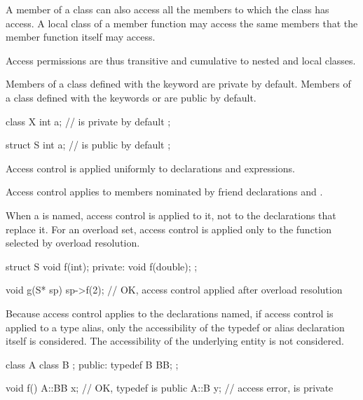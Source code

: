 \pnum
A member of a class can also access all the members to which the class has access.
A local class of a member function may access
the same members that the member function itself may access.
\begin{footnote}
Access
permissions are thus transitive and cumulative to nested
and local classes.
\end{footnote}

\pnum
{}%
%
%
Members of a class defined with the keyword
are private by default.
Members of a class defined with the keywords
 or 
are public by default.
\begin{example}
\begin{codeblock}
class X {
  int a;            //  is private by default
};

struct S {
  int a;            //  is public by default
};
\end{codeblock}
\end{example}

\pnum
Access control is applied uniformly to declarations and expressions.
\begin{note}
Access control applies to members nominated by
friend declarations and
.
\end{note}
When a  is named,
access control is applied to it, not to the declarations that replace it.
For an overload set, access control is applied only to
the function selected by overload resolution.
\begin{example}
\begin{codeblock}
struct S {
  void f(int);
private:
  void f(double);
};

void g(S* sp) {
  sp->f(2);         // OK, access control applied after overload resolution
}
\end{codeblock}
\end{example}
\begin{note}
Because access control applies to the declarations named,
if access control is applied to a type alias,
only the accessibility of the typedef or alias declaration itself is considered.
The accessibility of the underlying entity is not considered.
\begin{example}
\begin{codeblock}
class A {
  class B { };
public:
  typedef B BB;
};

void f() {
  A::BB x;          // OK, typedef  is public
  A::B y;           // access error,  is private
}
\end{codeblock}
\end{example}
\end{note}

